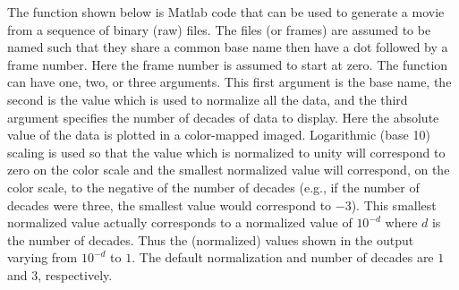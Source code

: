 The function shown below is Matlab code that can be used to generate a
movie from a sequence of binary (raw) files.  The files (or frames)
are assumed to be named such that they share a common base name then
have a dot followed by a frame number.  Here the frame number is
assumed to start at zero.  The function can have one, two, or three
arguments.  This first argument is the base name, the second is the
value which is used to normalize all the data, and the third argument
specifies the number of decades of data to display.  Here the absolute
value of the data is plotted in a color-mapped imaged.  Logarithmic
(base 10) scaling is used so that the value which is normalized to
unity will correspond to zero on the color scale and the smallest
normalized value will correspond, on the color scale, to the negative
of the number of decades (e.g., if the number of decades were three,
the smallest value would correspond to $-3$).  This smallest
normalized value actually corresponds to a normalized value of
$10^{-d}$ where $d$ is the number of decades.  Thus the (normalized)
values shown in the output varying from $10^{-d}$ to $1$.  The default
normalization and number of decades are $1$ and $3$, respectively.

